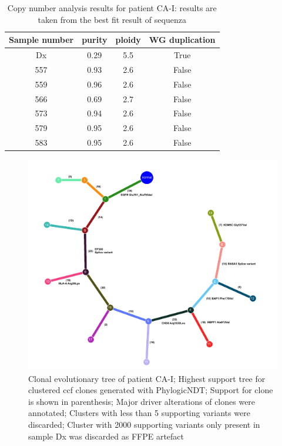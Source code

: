 \begin{table}[ht]
\caption[Copy number analysis results for patient CA-I]{Copy number analysis results for patient CA-I: results are taken from the best fit result of sequenza}\label{tab:ca51cnv}
\centering
{}
\begin{tabular}{|c|c|c|c|}
\toprule
\hline
 \rowcolor{gray!50}
\textbf{Sample number} & \textbf{purity} & \textbf{ploidy} & \textbf{WG duplication}\\
\hline
 Dx  & \num{0.29} & \num{5.5} & True	\\
 557 & \num{0.93} & \num{2.6} & False \\
 559 & \num{0.96} & \num{2.6} & False \\
 566 & \num{0.69} & \num{2.7} & False \\
 573 & \num{0.94} & \num{2.6} & False \\
 579 & \num{0.95} & \num{2.6} & False \\
 583 & \num{0.95} & \num{2.6} & False \\
 \hline
\bottomrule
\end{tabular}
\end{table} 


\begin{figure}[ht]
\centering
\includegraphics[width=.99\linewidth]{Figures/CASCADE/CA51/CA51.clonaltree.pdf}
\caption[Clonal evolutionary tree CA-I]{Clonal evolutionary tree of patient CA-I; Highest support tree for clustered ccf clones generated with PhylogicNDT; Support for clone is shown in parenthesis; Major driver alterations of clones were annotated; Clusters with less than 5 supporting variants were discarded; Cluster with 2000 supporting variants only present in sample Dx was discarded as FFPE artefact} \label{fig:ca51.clonalTree}
\end{figure}

